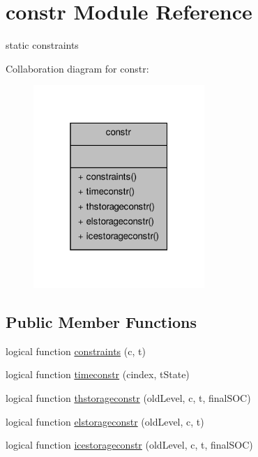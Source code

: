 \hypertarget{classconstr}{\section{constr Module Reference}
\label{classconstr}
}


static constraints  




Collaboration diagram for constr\-:
\nopagebreak
\begin{figure}[H]
\begin{center}
\leavevmode
\includegraphics[width=184pt]{classconstr__coll__graph}
\end{center}
\end{figure}
\subsection*{Public Member Functions}
\begin{DoxyCompactItemize}
\item 
logical function \hyperlink{classconstr_a2e4697c7ad9fa86cef6903a66f9b2a5a}{constraints} (c, t)
\item 
logical function \hyperlink{classconstr_a09f37706c4e72fa0b97fe46ffa42443f}{timeconstr} (cindex, t\-State)
\item 
logical function \hyperlink{classconstr_a0f906039ff5e7e6c348520d7f3dd8686}{thstorageconstr} (old\-Level, c, t, final\-S\-O\-C)
\item 
logical function \hyperlink{classconstr_ab630a36bd00e0335024da62e048db721}{elstorageconstr} (old\-Level, c, t)
\item 
logical function \hyperlink{classconstr_ac2cf2f1c67f8c3e78de9a69e7b62703b}{icestorageconstr} (old\-Level, c, t, final\-S\-O\-C)
\end{DoxyCompactItemize}


